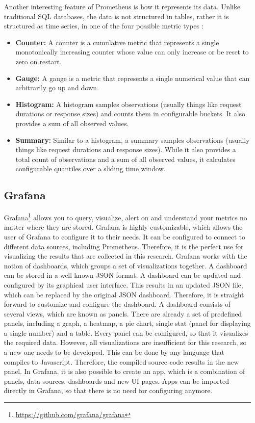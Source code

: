 Another interesting feature of Prometheus is how it represents its data. Unlike traditional SQL databases, the data is not structured in tables, rather it is structured as time series, in one of the four possible metric types \cite{prometheus_metrics}:
\begin{itemize}
    \item \textbf{Counter: }A counter is a cumulative metric that represents a single monotonically increasing counter whose value can only increase or be reset to zero on restart.
    \item \textbf{Gauge: }A gauge is a metric that represents a single numerical value that can arbitrarily go up and down.
    \item \textbf{Histogram: }A histogram samples observations (usually things like request durations or response sizes) and counts them in configurable buckets. It also provides a sum of all observed values.
    \item \textbf{Summary: }Similar to a histogram, a summary samples observations (usually things like request durations and response sizes). While it also provides a total count of observations and a sum of all observed values, it calculates configurable quantiles over a sliding time window.
\end{itemize}

\subsection{Grafana}
Grafana\footnote{\url{https://github.com/grafana/grafana}} allows you to query, visualize, alert on and understand your metrics no matter where they are stored. Grafana is highly customizable, which allows the user of Grafana to configure it to their needs. It can be configured to connect to different data sources, including Prometheus. Therefore, it is the perfect use for visualizing the results that are collected in this research. Grafana works with the notion of dashboards, which groups a set of visualizations together. A dashboard can be stored in a well known JSON format. A dashboard can be updated and configured by its graphical user interface. This results in an updated JSON file, which can be replaced by the original JSON dashboard. Therefore, it is straight forward to customize and configure the dashboard. A dashboard consists of several views, which are known as panels. There are already a set of predefined panels, including a graph, a heatmap, a pie chart, single stat (panel for displaying a single number) and a table. Every panel can be configured, so that it visualizes the required data. However, all visualizations are insufficient for this research, so a new one needs to be developed. This can be done by any language that compiles to Javascript. Therefore, the compiled source code results in the new panel. In Grafana, it is also possible to create an app, which is a combination of panels, data sources, dashboards and new UI pages. Apps can be imported directly in Grafana, so that there is no need for configuring anymore. 

